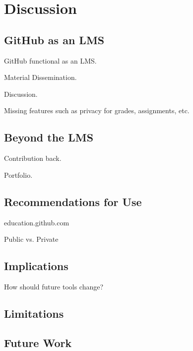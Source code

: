 \chapter{Discussion}

\section{GitHub as an LMS}
GitHub functional as an LMS.

Material Dissemination.

Discussion.

Missing features such as privacy for grades, assignments, etc.

\section{Beyond the LMS}
Contribution back.

Portfolio.

\section{Recommendations for Use}
education.github.com

Public vs. Private

\section{Implications}

How should future tools change?

\section{Limitations}

\section{Future Work}
